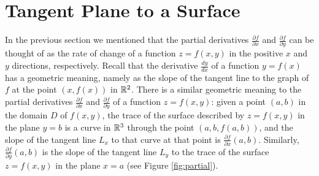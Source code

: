 \section{Tangent Plane to a Surface}
In the previous section we mentioned that the partial derivatives $\frac{\partial f}{\partial x}$ and
$\frac{\partial f}{\partial y}$ can be thought of as the rate of change of a function $z = f(x,y)$ in the positive
$x$ and $y$ directions, respectively. Recall that the derivative $\frac{dy}{dx}$ of a function $y = f(x)$
has a geometric meaning, namely as the slope of the tangent line to the graph of $f$ at the point $(x,f(x))$ in
$\mathbb{R}^{2}$. There is a similar geometric meaning to the partial derivatives $\frac{\partial f}{\partial x}$ and
$\frac{\partial f}{\partial y}$ of a function $z = f(x,y)$: given a point $(a,b)$ in the domain $D$ of
$f(x,y)$, the trace of the
surface described by $z = f(x,y)$ in the plane $y = b$ is a curve in $\mathbb{R}^{3}$ through the point $(a,b,f(a,b))$, and
the slope of the tangent line $L_x$ to that curve at that point is $\frac{\partial f}{\partial x}(a,b)$. Similarly,
$\frac{\partial f}{\partial y}(a,b)$ is the slope of the tangent line $L_y$ to the trace of the surface $z = f(x,y)$ in
the plane $x = a$ (see Figure \ref{fig:partial}).

